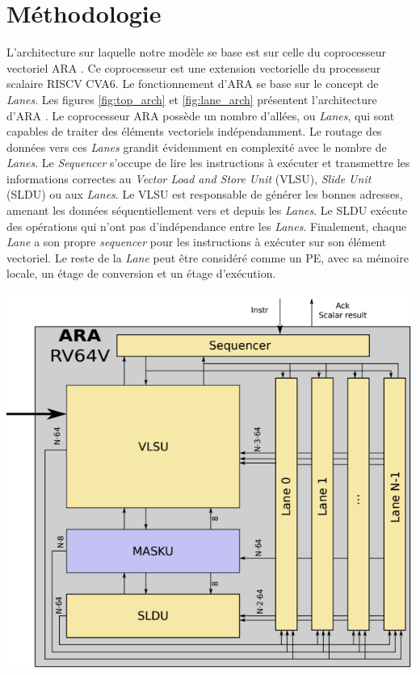 \documentclass[11pt,letterpaper]{article}
\begin{document}
\section{Méthodologie}
    \begin{multicols}{2}

    L'architecture sur laquelle notre modèle se base est sur celle du coprocesseur 
    vectoriel ARA \cite{ara_paper}. Ce coprocesseur est une extension vectorielle du processeur scalaire
    RISCV CVA6. Le fonctionnement d’ARA se base sur le concept de \textit{Lanes}. 
    Les figures \ref{fig:top_arch} et \ref{fig:lane_arch} présentent l'architecture d’ARA \cite{bougenot_2020}.
    Le coprocesseur ARA possède un nombre d'allées, ou \textit{Lanes}, qui sont capables de traiter des
    éléments vectoriels indépendamment. Le routage des données vers ces \textit{Lanes} grandit évidemment en complexité
    avec le nombre de \textit{Lanes}. Le \textit{Sequencer} s'occupe de lire les instructions à exécuter 
    et transmettre les informations correctes au \textit{Vector Load and Store Unit} (VLSU), 
    \textit{Slide Unit} (SLDU) ou aux \textit{Lanes}. Le VLSU est responsable de générer les bonnes
    adresses, amenant les données séquentiellement vers et depuis les \textit{Lanes}. 
    Le SLDU exécute des opérations qui n'ont pas d'indépendance entre les \textit{Lanes}.
    Finalement, chaque \textit{Lane} a son propre \textit{sequencer} pour les instructions à exécuter
    sur son élément vectoriel. Le reste de la \textit{Lane} peut être considéré comme un PE, avec sa mémoire locale,
    un étage de conversion et un étage d'exécution.

    {\centering
    \includegraphics[width=\linewidth]{ara_arch.png}
    \captionsetup{hypcap=false}
    \label{fig:top_arch}}
    \bigskip


\end{multicols}
\end{document}
